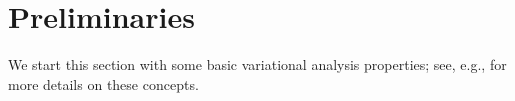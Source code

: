 \section{Preliminaries}\label{sec:preliminaries}
We start this section with some basic  variational analysis properties; see, e.g., \cite{BS2,RTW} for more details on these concepts.
%
%
